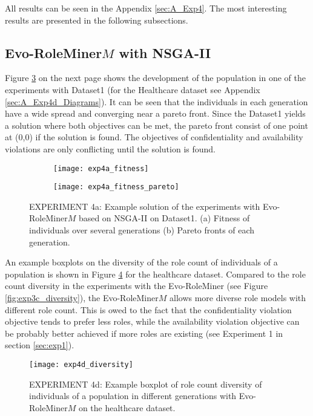 All results can be seen in the Appendix \ref{sec:A_Exp4}. The most interesting results are presented in the following subsections.

\subsection{Evo-RoleMiner$M$ with NSGA-II}
Figure \ref{fig:exp4a_fitness} on the next page shows the development of the population in one of the experiments with Dataset1 (for the Healthcare dataset see Appendix \ref{sec:A_Exp4d_Diagrams}). It can be seen that the individuals in each generation have a wide spread and converging near a pareto front. Since the Dataset1 yields a solution where both objectives can be met, the pareto front consist of one point at (0,0) if the solution is found. The objectives of confidentiality and availability violations are only conflicting until the solution is found.

\begin{figure}[H]
	\centering
	\begin{subfigure}{\textwidth}
		\centering
		\texttt{[image: exp4a\_fitness]}
		\caption{}
		\label{fig:exp4a_fitness_A}
	\end{subfigure}
	\begin{subfigure}{\textwidth}
		\centering
		\texttt{[image: exp4a\_fitness\_pareto]}
		\caption{}
		\label{fig:exp4a_fitness_B}
	\end{subfigure}
	\caption{EXPERIMENT 4a: Example solution of the experiments with Evo-RoleMiner$M$ based on NSGA-II on Dataset1. (a) Fitness of individuals over several generations (b) Pareto fronts of each generation.}
	\label{fig:exp4a_fitness}
\end{figure}

An example boxplots on the diversity of the role count of individuals of a population is shown in Figure \ref{fig:exp4d_diversity} for the healthcare dataset. Compared to the role count diversity in the experiments with the Evo-RoleMiner (see Figure \ref{fig:exp3c_diversity}), the Evo-RoleMiner$M$ allows more diverse role models with different role count. This is owed to the fact that the confidentiality violation objective tends to prefer less roles, while the availability violation objective can be probably better achieved if more roles are existing (see Experiment 1 in section \ref{sec:exp1}).

\begin{figure}[H]
	\centering
	\texttt{[image: exp4d\_diversity]}
	\caption{EXPERIMENT 4d: Example boxplot of role count diversity of individuals of a population in different generations with Evo-RoleMiner$M$ on the healthcare dataset.}
	\label{fig:exp4d_diversity}
\end{figure}

